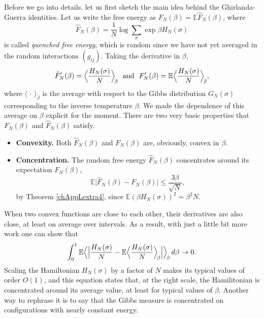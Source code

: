 \documentclass[12pt]{article}
\newcommand{\e}{\mathbb{E}}
\newcommand{\la}{\langle}
\newcommand{\ra}{\rangle}
\theoremstyle{nonumberplain}
\begin{document}
Before we go into details, let us first sketch the main idea behind the Ghirlanda-Guerra identities. Let us write the free energy as $F_N(\beta) = \e \hat{F}_N(\beta)$, where
$$
\hat{F}_N(\beta) = \frac{1}{N}\log \sum_{\sigma} \exp \beta H_N(\sigma)
$$
is called \emph{quenched free energy}, which is random since we have not yet averaged in the random interactions $(g_{ij})$. Taking the derivative in $\beta$,
$$
\hat{F}_N'(\beta)= \Bigl\la \frac{H_N(\sigma)}{N} \Bigr\ra_{\hspace{-0.5mm}\beta}
\,\,\mbox{ and }\,\,
{F}_N'(\beta)= \e \Bigl\la \frac{H_N(\sigma)}{N} \Bigr\ra_{\hspace{-0.5mm}\beta},
$$
where $\la\,\cdot\,\ra_\beta$ is the average with respect to the Gibbs distribution $G_N(\sigma)$ corresponding to the inverse temperature $\beta$. We made the dependence of this average on $\beta$ explicit for the moment. There are two very basic properties that $F_N(\beta)$ and $\hat{F}_N(\beta)$ satisfy.
\begin{itemize}
\item[] \textbf{Convexity.} Both $\hat{F}_N(\beta)$ and $F_N(\beta)$ are, obviously, convex in $\beta$.

\item[] \textbf{Concentration.} The random free energy $\hat{F}_N(\beta)$ concentrates around its expectation $F_N(\beta)$,
$$
\e \bigl|\hat{F}_N(\beta) -F_N(\beta) \bigr| \leq \frac{3\beta}{\sqrt{N}},
$$
by Theorem \ref{chAppLextra4}, since $\e (\beta H_N(\sigma))^2 = \beta^2 N.$ 
\end{itemize}
When two convex functions are close to each other, their derivatives are also close, at least on average over intervals. As a result, with just a little bit more work one can show that
\begin{equation}
\int_0^1 \e \Bigl\la \Bigl| \frac{H_N(\sigma)}{N} - \e \Bigl\la \frac{H_N(\sigma)}{N} \Bigr\ra_{\hspace{-0.5mm}\beta} \Bigr| \Bigr\ra_{\hspace{-0.5mm}\beta} \, d\beta \to 0.
\label{GGprelim01}
\end{equation}
Scaling the Hamiltonian $H_N(\sigma)$ by a factor of $N$ makes its typical values of order $O(1)$, and this equation states that, at the right scale, the Hamilitonian is concentrated around its average value, at least for typical values of $\beta$. Another way to rephrase it is to say that the Gibbs measure is concentrated on configurations with nearly constant energy.
\end{document}
